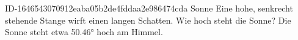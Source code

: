 \begin{exercise}
      {ID-1646543070912eaba05b2de4fddaa2e986474cda}
      {Sonne}
  \ifproblem\problem
    Eine  hohe, senkrecht stehende Stange wirft einen
     langen Schatten. Wie hoch steht die Sonne?
  \fi
  \ifoutcome\outcome
    Die Sonne steht etwa \ang{50.46} hoch am Himmel.
  \fi
\end{exercise}
